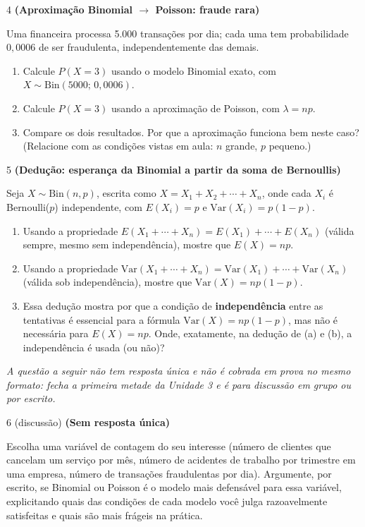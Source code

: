 \documentclass[11pt]{article}
\begin{document}
\begin{questao}{4} \textbf{(Aproximação Binomial $\to$ Poisson: fraude rara)}

Uma financeira processa 5.000 transações por dia; cada uma tem probabilidade $0{,}0006$ de ser
fraudulenta, independentemente das demais.

\begin{enumerate}[label=(\alph*)]
  \item Calcule $P(X=3)$ usando o modelo Binomial exato, com $X\sim\text{Bin}(5000;\,0{,}0006)$.
  \item Calcule $P(X=3)$ usando a aproximação de Poisson, com $\lambda=np$.
  \item Compare os dois resultados. Por que a aproximação funciona bem neste caso? (Relacione com
    as condições vistas em aula: $n$ grande, $p$ pequeno.)
\end{enumerate}
\end{questao}

\begin{questao}{5} \textbf{(Dedução: esperança da Binomial a partir da soma de Bernoullis)}

Seja $X\sim\text{Bin}(n,p)$, escrita como $X=X_1+X_2+\cdots+X_n$, onde cada $X_i$ é
Bernoulli($p$) independente, com $E(X_i)=p$ e $\mathrm{Var}(X_i)=p(1-p)$.

\begin{enumerate}[label=(\alph*)]
  \item Usando a propriedade $E(X_1+\cdots+X_n) = E(X_1)+\cdots+E(X_n)$ (válida sempre, mesmo sem
    independência), mostre que $E(X)=np$.
  \item Usando a propriedade $\mathrm{Var}(X_1+\cdots+X_n)=\mathrm{Var}(X_1)+\cdots+
    \mathrm{Var}(X_n)$ (válida sob independência), mostre que $\mathrm{Var}(X)=np(1-p)$.
  \item Essa dedução mostra por que a condição de \textbf{independência} entre as tentativas é
    essencial para a fórmula $\mathrm{Var}(X)=np(1-p)$, mas não é necessária para $E(X)=np$. Onde,
    exatamente, na dedução de (a) e (b), a independência é usada (ou não)?
\end{enumerate}
\end{questao}

\bigskip
\noindent\textit{A questão a seguir não tem resposta única e não é cobrada em prova no mesmo
formato: fecha a primeira metade da Unidade 3 e é para discussão em grupo ou por escrito.}

\begin{questao}{6 (discussão)} \textbf{(Sem resposta única)}

Escolha uma variável de contagem do seu interesse (número de clientes que cancelam um serviço por
mês, número de acidentes de trabalho por trimestre em uma empresa, número de transações
fraudulentas por dia). Argumente, por escrito, se Binomial ou Poisson é o modelo mais defensável
para essa variável, explicitando quais das condições de cada modelo você julga razoavelmente
satisfeitas e quais são mais frágeis na prática.
\end{questao}
\end{document}
